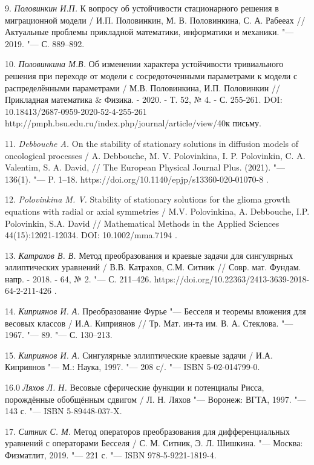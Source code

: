 
9. {\it Половинкин И.П.} К вопросу об устойчивости стационарного
решения в миграционной модели / И.П. Половинкин, М. В.
Половинкина, С. А. Рабееах // Актуальные проблемы прикладной
математики, информатики и механики. "--- 2019. "--- С. 889--892.

10. {\it Половинкина М.В.} Об изменении характера устойчивости
тривиального решения при переходе от модели с сосредоточенными
параметрами к модели с распределёнными параметрами / М.В.
Половинкина, И.П. Половинкин // Прикладная математика $\&$ Физика.
- 2020. -  Т. 52, № 4. - С. 255-261. DOI:
10.18413/2687-0959-2020-52-4-255-261
http://pmph.bsu.edu.ru/index.php/journal/article/view/40к письму.



11. {\it Debbouche A.} On the stability of stationary solutions in
diffusion models of oncological processes / A. Debbouche, M. V.
Polovinkina, I. P. Polovinkin, C. A. Valentim, S. A. David, // The
European Physical Journal Plus. (2021). "--- 136(1). "--- P. 1--18.
https://doi.org/10.1140/epjp/s13360-020-01070-8 .

12. {\it  Polovinkina M. V.} Stability of stationary solutions for
the glioma growth equations with radial or axial symmetries / M.V.
Polovinkina, A. Debbouche, I.P. Polovinkin, S.A. David //
Mathematical Methods in the Applied Sciences 44(15):12021-12034.
DOI: 10.1002/mma.7194 .


13. {\it Катрахов В. В.} Метод преобразования и краевые задачи для
сингулярных эллиптических уравнений / В.В. Катрахов, С.М. Ситник
// Совр. мат. Фундам. напр. - 2018. - 64, № 2. "--- С. 211--426.
https://doi.org/10.22363/2413-3639-2018-64-2-211-426 .

14. {\it Киприянов И. А.} Преобразование Фурье "--- Бесселя и
теоремы вложения для весовых классов / И.А. Киприянов // Тр. Мат.
ин-та им. В. А. Стеклова. "--- 1967. "--- 89. "--- С. 130--213.

15. {\it Киприянов И. А.} Сингулярные эллиптические краевые задачи
/ И.А. Киприянов "--- М.: Наука, 1997. "--- 208 с/. "--- ISBN
5-02-014799-0.

16.0 {\it Ляхов Л. Н.} Весовые сферические функции и потенциалы
Рисса, порождённые обобщённым сдвигом / Л. Н. Ляхов "--- Воронеж:
ВГТА, 1997. "--- 143 с. "--- ISBN 5-89448-037-X.

17. {\it Ситник С. М.} Метод операторов преобразования для
дифференциальных уравнений с операторами Бесселя / С. М. Ситник,
Э. Л. Шишкина. "--- Москва: Физматлит, 2019. "--- 221 с. "--- ISBN
978-5-9221-1819-4.








